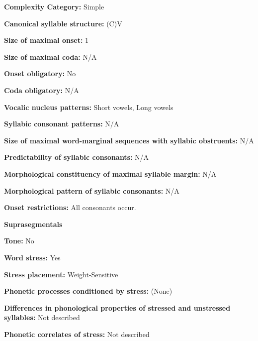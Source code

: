 \textbf{Complexity Category:} Simple



\textbf{Canonical syllable structure:} (C)V \citep[28-9]{Robinson2011}



\textbf{Size of maximal onset:} 1



\textbf{Size of maximal coda:} N/A



\textbf{Onset obligatory:} No



\textbf{Coda obligatory:} N/A



\textbf{Vocalic nucleus patterns:} Short vowels, Long vowels



\textbf{Syllabic consonant patterns:} N/A



\textbf{Size of maximal word{}-marginal sequences with syllabic obstruents:} N/A



\textbf{Predictability of syllabic consonants:} N/A



\textbf{Morphological constituency of maximal syllable margin:} N/A



\textbf{Morphological pattern of syllabic consonants:} N/A



\textbf{Onset restrictions:} All consonants occur.



\textbf{Suprasegmentals}



\textbf{Tone:} No



\textbf{Word stress:} Yes



\textbf{Stress placement:} Weight-Sensitive



\textbf{Phonetic processes conditioned by stress:} (None)



\textbf{Differences in phonological properties of stressed and unstressed syllables:} Not described



\textbf{Phonetic correlates of stress:} Not described




